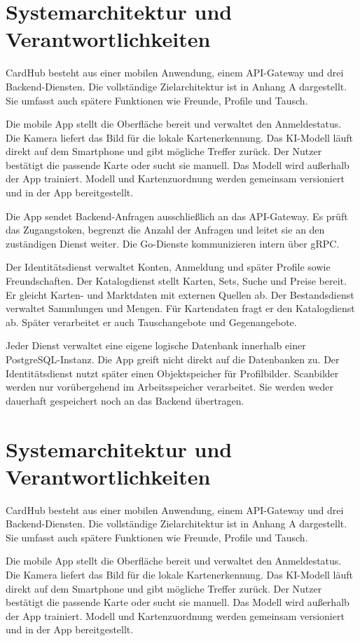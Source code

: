 \section{Systemarchitektur und Verantwortlichkeiten}

CardHub besteht aus einer mobilen Anwendung, einem API-Gateway und drei Backend-Diensten. Die vollständige Zielarchitektur ist in Anhang A dargestellt. Sie umfasst auch spätere Funktionen wie Freunde, Profile und Tausch.

Die mobile App stellt die Oberfläche bereit und verwaltet den Anmeldestatus. Die Kamera liefert das Bild für die lokale Kartenerkennung. Das KI-Modell läuft direkt auf dem Smartphone und gibt mögliche Treffer zurück. Der Nutzer bestätigt die passende Karte oder sucht sie manuell. Das Modell wird außerhalb der App trainiert. Modell und Kartenzuordnung werden gemeinsam versioniert und in der App bereitgestellt.

Die App sendet Backend-Anfragen ausschließlich an das API-Gateway. Es prüft das Zugangstoken, begrenzt die Anzahl der Anfragen und leitet sie an den zuständigen Dienst weiter. Die Go-Dienste kommunizieren intern über gRPC.

Der Identitätsdienst verwaltet Konten, Anmeldung und später Profile sowie Freundschaften. Der Katalogdienst stellt Karten, Sets, Suche und Preise bereit. Er gleicht Karten- und Marktdaten mit externen Quellen ab. Der Bestandsdienst verwaltet Sammlungen und Mengen. Für Kartendaten fragt er den Katalogdienst ab. Später verarbeitet er auch Tauschangebote und Gegenangebote.

Jeder Dienst verwaltet eine eigene logische Datenbank innerhalb einer PostgreSQL-Instanz. Die App greift nicht direkt auf die Datenbanken zu. Der Identitätsdienst nutzt später einen Objektspeicher für Profilbilder. Scanbilder werden nur vorübergehend im Arbeitsspeicher verarbeitet. Sie werden weder dauerhaft gespeichert noch an das Backend übertragen.

\section{Systemarchitektur und Verantwortlichkeiten}

CardHub besteht aus einer mobilen Anwendung, einem API-Gateway und drei Backend-Diensten. Die vollständige Zielarchitektur ist in Anhang A dargestellt. Sie umfasst auch spätere Funktionen wie Freunde, Profile und Tausch.

Die mobile App stellt die Oberfläche bereit und verwaltet den Anmeldestatus. Die Kamera liefert das Bild für die lokale Kartenerkennung. Das KI-Modell läuft direkt auf dem Smartphone und gibt mögliche Treffer zurück. Der Nutzer bestätigt die passende Karte oder sucht sie manuell. Das Modell wird außerhalb der App trainiert. Modell und Kartenzuordnung werden gemeinsam versioniert und in der App bereitgestellt.

